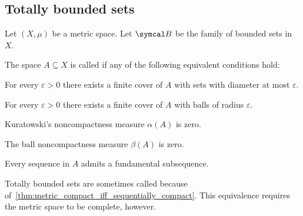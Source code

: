 \subsection{Totally bounded sets}\label{sec:totally_bounded_sets}

Let \( (X, \mu) \) be a metric space. Let \( \Cal{B} \) be the family of bounded sets in \( X \).

\begin{definition}\label{def:totally_bounded_set}
  The space \( A \subseteq X \) is called  if any of the following equivalent conditions hold:

  \begin{defenum}
    \item\label{def:totally_bounded_set/sets} For every \( \varepsilon > 0 \) there exists a finite cover of \( A \) with sets with diameter at most \( \varepsilon \).
    \item\label{def:totally_bounded_set/balls} For every \( \varepsilon > 0 \) there exists a finite cover of \( A \) with balls of radius \( \varepsilon \).
    \item\label{def:totally_bounded_set/zero_noncompactness/sets} Kuratowski's noncompactness measure \( \alpha(A) \) is zero.
    \item\label{def:totally_bounded_set/zero_noncompactness/balls} The ball noncompactness measure \( \beta(A) \) is zero.
    \item\label{def:totally_bounded_set/fundamental_subsequences} Every sequence in \( A \) admits a fundamental subsequence.
  \end{defenum}

  Totally bounded sets are sometimes called  because of~\cref{thm:metric_compact_iff_sequentially_compact}. This equivalence requires the metric space to be complete, however.
\end{definition}
